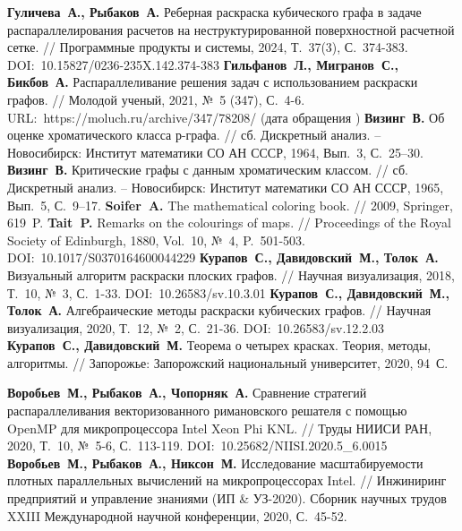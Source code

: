 \begin{thebibliography}{99}
\textbf{Гуличева~А., Рыбаков~А.} Реберная раскраска кубического графа в задаче распараллелирования расчетов на неструктурированной поверхностной расчетной сетке. // Программные продукты и системы, 2024, Т.~37(3), С.~374-383. DOI:~10.15827/0236-235X.142.374-383
\textbf{Гильфанов~Л., Мигранов~С., Бикбов~А.} Распараллеливание решения задач с использованием раскраски графов. // Молодой ученый, 2021, №~5 (347), С.~4-6. URL:~https://moluch.ru/archive/347/78208/ (дата обращения \StrDate)
\textbf{Визинг~В.} Об оценке хроматического класса р-графа. // сб. Дискретный анализ. -- Новосибирск: Институт математики СО АН СССР, 1964, Вып.~3, С.~25–30.
\textbf{Визинг~В.} Критические графы с данным хроматическим классом. // сб. Дискретный анализ. -- Новосибирск: Институт математики СО АН СССР, 1965, Вып.~5, С.~9–17.
\textbf{Soifer~A.} The mathematical coloring book. // 2009, Springer, 619~P.
\textbf{Tait~P.} Remarks on the colourings of maps. // Proceedings of the Royal Society of Edinburgh, 1880, Vol.~10, №~4, P.~501-503. DOI:~10.1017/S0370164600044229
\textbf{Курапов~С., Давидовский~М., Толок~А.} Визуальный алгоритм раскраски плоских графов. // Научная визуализация, 2018, Т.~10, №~3, С.~1-33. DOI:~10.26583/sv.10.3.01
\textbf{Курапов~С., Давидовский~М., Толок~А.} Алгебраические методы раскраски кубических графов. // Научная визуализация, 2020, Т.~12, №~2, С.~21-36. DOI:~10.26583/sv.12.2.03
\textbf{Курапов~С., Давидовский~М.} Теорема о четырех красках. Теория, методы, алгоритмы. // Запорожье: Запорожский национальный университет, 2020, 94~С.

\textbf{Воробьев~М., Рыбаков~А., Чопорняк~А.} Сравнение стратегий распараллеливания векторизованного римановского решателя с помощью OpenMP для микропроцессора Intel Xeon Phi KNL. // Труды НИИСИ РАН, 2020, Т.~10, №~5-6, С.~113-119. DOI:~10.25682/NIISI.2020.5\_6.0015
\textbf{Воробьев~М., Рыбаков~А., Никсон~М.} Исследование масштабируемости плотных параллельных вычислений на микропроцессорах Intel. // Инжиниринг предприятий и управление знаниями (ИП \& УЗ-2020). Сборник научных трудов XXIII Международной научной конференции, 2020, С.~45-52.



\end{thebibliography}
